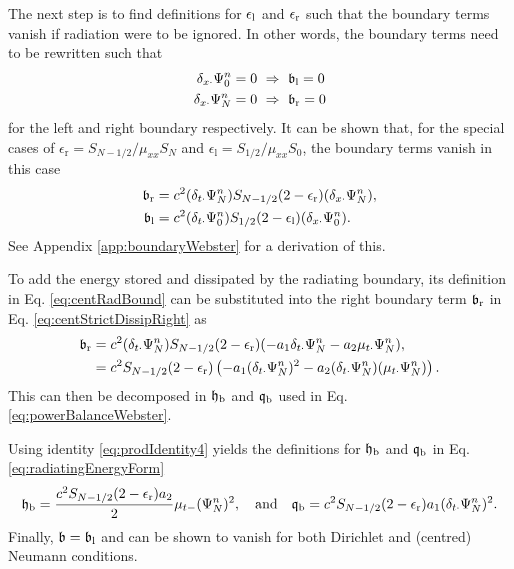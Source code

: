 {The next step is to find definitions for $\epsilon_\text{l}$ and $\epsilon_\text{r}$ such that the boundary terms vanish if radiation were to be ignored. In other words, the boundary terms need to be rewritten such that 
\begin{align*}
    \delta_{x\cdot} \Psi_0^n &= 0\  \Rightarrow\ \mathfrak{b}_\text{l} = 0 \\
    \delta_{x\cdot} \Psi_N^n &= 0\  \Rightarrow\ \mathfrak{b}_\text{r} = 0
\end{align*} 
for the left and right boundary respectively. It can be shown that, for the special cases of $\epsilon_\text{r} = S_{N-1/2}/\mu_{xx}S_N$ and $\epsilon_\text{l} = S_{1/2}/\mu_{xx}S_0$, the boundary terms vanish in this case
\begin{subequations}\label{eq:centStrictDissip}
\begin{align}
    \mathfrak{b}_\text{r} &= c^2 (\delta_{t\cdot}\Psi_N^n)S_{N-1/2}(2-\epsilon_\text{r})(\delta_{x\cdot}\Psi_N^n)\label{eq:centStrictDissipRight},\\
    \mathfrak{b}_\text{l} &= c^2 (\delta_{t\cdot}\Psi_0^n)S_{1/2}(2-\epsilon_\text{l})(\delta_{x\cdot}\Psi_0^n).\label{eq:centStrictDissipLeft}
\end{align}
\end{subequations}
See Appendix \ref{app:boundaryWebster} for a derivation of this. %

To add the energy stored and dissipated by the radiating boundary, its definition in Eq. \eqref{eq:centRadBound} can be substituted into the right boundary term $\mathfrak{b}_\text{r}$ in Eq. \eqref{eq:centStrictDissipRight} as 
\begin{align*}
    \mathfrak{b}_\text{r} &= c^2 (\delta_{t\cdot}\Psi_N^n)S_{N-1/2}(2-\epsilon_\text{r})(-a_1\delta_{t\cdot}\Psi_N^n - a_2\mu_{t\cdot}\Psi_N^n),\\
    &= c^2 S_{N-1/2}(2-\epsilon_\text{r})\left(-a_1(\delta_{t\cdot}\Psi_N^n)^2 - a_2(\delta_{t\cdot}\Psi_N^n)(\mu_{t\cdot}\Psi_N^n)\right).
\end{align*}
This can then be decomposed in $\mathfrak{h}_\text{b}$ and $\mathfrak{q}_\text{b}$ used in Eq. \eqref{eq:powerBalanceWebster}. 

Using identity \eqref{eq:prodIdentity4} yields the definitions for $\mathfrak{h}_\text{b}$ and $\mathfrak{q}_\text{b}$ in Eq. \eqref{eq:radiatingEnergyForm}
\begin{equation}
    \mathfrak{h}_\text{b} = \frac{c^2 S_{N-1/2}(2-\epsilon_\text{r}) a_2}{2} \mu_{t-}(\Psi_N^n)^2, \quad \text{and} \quad \mathfrak{q}_\text{b} = c^2 S_{N-1/2}(2-\epsilon_\text{r})a_1(\delta_{t\cdot}\Psi_N^n)^2.
\end{equation}
Finally, $\mathfrak{b} = \mathfrak{b}_\text{l}$ and can be shown to vanish for both Dirichlet and (centred) Neumann conditions.

}
